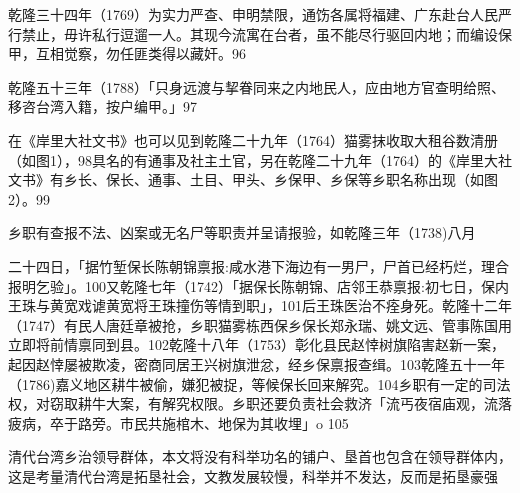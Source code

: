 乾隆三十四年（1769）为实力严查、申明禁限，通饬各属将福建、广东赴台人民严行禁止，毋许私行逗遛一人。其现今流寓在台者，虽不能尽行驱回内地；而编设保甲，互相觉察，勿任匪类得以藏奸。96

乾隆五十三年（1788）「只身远渡与挈眷同来之内地民人，应由地方官查明给照、移咨台湾入籍，按户编甲。」97

在《岸里大社文书》也可以见到乾隆二十九年（1764）猫雾抹收取大租谷数清册（如图1），98具名的有通事及社主土官，另在乾隆二十九年（1764）的《岸里大社文书》有乡长、保长、通事、土目、甲头、乡保甲、乡保等乡职名称出现（如图2）。99

乡职有查报不法、凶案或无名尸等职责并呈请报验，如乾隆三年（1738)八月

\vfill
\begin{BookNotes}
\end{BookNotes}


\noindent 二十四日，「据竹堑保长陈朝锦禀报:咸水港下海边有一男尸，尸首已经朽烂，理合报明乞验」。100又乾隆七年（1742）「据保长陈朝锦、店邻王恭禀报:初七日，保内王珠与黄宽戏谑黄宽将王珠撞伤等情到职」，101后王珠医治不痊身死。乾隆十二年（1747）有民人唐廷章被抢，乡职猫雾栋西保乡保长郑永瑞、姚文远、管事陈国用立即将前情禀同到县。102乾隆十八年（1753）彰化县民赵悻树旗陷害赵新一案，起因赵悻屡被欺凌，密商同居王兴树旗泄忿，经乡保禀报查缉。103乾隆五十一年（1786)嘉义地区耕牛被偷，嫌犯被捉，等候保长回来解究。104乡职有一定的司法权，对窃取耕牛大案，有解究权限。乡职还要负责社会救济「流丐夜宿庙观，流落疲病，卒于路旁。市民共施棺木、地保为其收埋」o 105


清代台湾乡治领导群体，本文将没有科举功名的铺户、垦首也包含在领导群体内，这是考量清代台湾是拓垦社会，文教发展较慢，科举并不发达，反而是拓垦豪强

\vfill
\begin{BookNotes}
\end{BookNotes}

